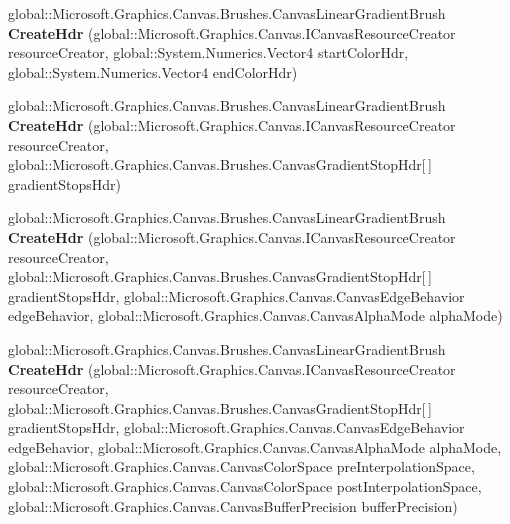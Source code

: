\begin{DoxyCompactItemize}
\item 
\mbox{\label{interface_microsoft_1_1_graphics_1_1_canvas_1_1_brushes_1_1_i_canvas_linear_gradient_brush_statics_aa478a0f38fa948c5b103ee834fb17cb9}} 
global\+::\+Microsoft.\+Graphics.\+Canvas.\+Brushes.\+Canvas\+Linear\+Gradient\+Brush {\bfseries Create\+Hdr} (global\+::\+Microsoft.\+Graphics.\+Canvas.\+I\+Canvas\+Resource\+Creator resource\+Creator, global\+::\+System.\+Numerics.\+Vector4 start\+Color\+Hdr, global\+::\+System.\+Numerics.\+Vector4 end\+Color\+Hdr)
\item 
\mbox{\label{interface_microsoft_1_1_graphics_1_1_canvas_1_1_brushes_1_1_i_canvas_linear_gradient_brush_statics_ac231ec716863bab8840f768a97c723a7}} 
global\+::\+Microsoft.\+Graphics.\+Canvas.\+Brushes.\+Canvas\+Linear\+Gradient\+Brush {\bfseries Create\+Hdr} (global\+::\+Microsoft.\+Graphics.\+Canvas.\+I\+Canvas\+Resource\+Creator resource\+Creator, global\+::\+Microsoft.\+Graphics.\+Canvas.\+Brushes.\+Canvas\+Gradient\+Stop\+Hdr\mbox{[}$\,$\mbox{]} gradient\+Stops\+Hdr)
\item 
\mbox{\label{interface_microsoft_1_1_graphics_1_1_canvas_1_1_brushes_1_1_i_canvas_linear_gradient_brush_statics_a9d2b811c75f53b8dd5784da5b0d87a96}} 
global\+::\+Microsoft.\+Graphics.\+Canvas.\+Brushes.\+Canvas\+Linear\+Gradient\+Brush {\bfseries Create\+Hdr} (global\+::\+Microsoft.\+Graphics.\+Canvas.\+I\+Canvas\+Resource\+Creator resource\+Creator, global\+::\+Microsoft.\+Graphics.\+Canvas.\+Brushes.\+Canvas\+Gradient\+Stop\+Hdr\mbox{[}$\,$\mbox{]} gradient\+Stops\+Hdr, global\+::\+Microsoft.\+Graphics.\+Canvas.\+Canvas\+Edge\+Behavior edge\+Behavior, global\+::\+Microsoft.\+Graphics.\+Canvas.\+Canvas\+Alpha\+Mode alpha\+Mode)
\item 
\mbox{\label{interface_microsoft_1_1_graphics_1_1_canvas_1_1_brushes_1_1_i_canvas_linear_gradient_brush_statics_a12d4c23a29a2ebceddbe80b2d3bd32de}} 
global\+::\+Microsoft.\+Graphics.\+Canvas.\+Brushes.\+Canvas\+Linear\+Gradient\+Brush {\bfseries Create\+Hdr} (global\+::\+Microsoft.\+Graphics.\+Canvas.\+I\+Canvas\+Resource\+Creator resource\+Creator, global\+::\+Microsoft.\+Graphics.\+Canvas.\+Brushes.\+Canvas\+Gradient\+Stop\+Hdr\mbox{[}$\,$\mbox{]} gradient\+Stops\+Hdr, global\+::\+Microsoft.\+Graphics.\+Canvas.\+Canvas\+Edge\+Behavior edge\+Behavior, global\+::\+Microsoft.\+Graphics.\+Canvas.\+Canvas\+Alpha\+Mode alpha\+Mode, global\+::\+Microsoft.\+Graphics.\+Canvas.\+Canvas\+Color\+Space pre\+Interpolation\+Space, global\+::\+Microsoft.\+Graphics.\+Canvas.\+Canvas\+Color\+Space post\+Interpolation\+Space, global\+::\+Microsoft.\+Graphics.\+Canvas.\+Canvas\+Buffer\+Precision buffer\+Precision)

\end{DoxyCompactItemize}
